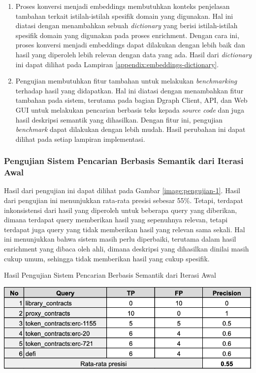 \begin{enumerate}
	\item Proses konversi menjadi embeddings membutuhkan konteks penjelasan tambahan terkait istilah-istilah spesifik domain yang digunakan. Hal ini diatasi dengan menambahkan sebuah \textit{dictionary} yang berisi istilah-istilah spesifik domain yang digunakan pada proses enrichment. Dengan cara ini, proses konversi menjadi embeddings dapat dilakukan dengan lebih baik dan hasil yang diperoleh lebih relevan dengan data yang ada. Hasil dari \textit{dictionary} ini dapat dilihat pada Lampiran \ref{appendix:embeddings-dictionary}.
	\item Pengujian membutuhkan fitur tambahan untuk melakukan \textit{benchmarking} terhadap hasil yang didapatkan. Hal ini diatasi dengan menambahkan fitur tambahan pada sistem, terutama pada bagian Dgraph Client, API, dan Web GUI untuk melakukan pencarian berbasis teks kepada \textit{source code} dan juga hasil deskripsi semantik yang dihasilkan. Dengan fitur ini, pengujian \textit{benchmark} dapat dilakukan dengan lebih mudah. Hasil perubahan ini dapat dilihat pada setiap lampiran implementasi.
\end{enumerate}

\subsubsection{Pengujian Sistem Pencarian Berbasis Semantik dari Iterasi Awal}

Hasil dari pengujian ini dapat dilihat pada Gambar \ref{image:pengujian-1}. Hasil dari pengujian ini menunjukkan rata-rata presisi sebesar 55\%. Tetapi, terdapat inkonsistensi dari hasil yang diperoleh untuk beberapa query yang diberikan, dimana terdapat query memberikan hasil yang sepenuhnya relevan, tetapi terdapat juga query yang tidak memberikan hasil yang relevan sama sekali. Hal ini menunjukkan bahwa sistem masih perlu diperbaiki, terutama dalam hasil enrichment yang dibaca oleh ahli, dimana deskripsi yang dihasilkan dinilai masih cukup umum, sehingga tidak memberikan hasil yang cukup spesifik.

\begin{table}[ht]
	\centering
	\caption{Hasil Pengujian Sistem Pencarian Berbasis Semantik dari Iterasi Awal}
	\includegraphics[width=1\textwidth]{resources/chapter-4/data-1-1.png}
	\label{image:pengujian-1}
\end{table}

